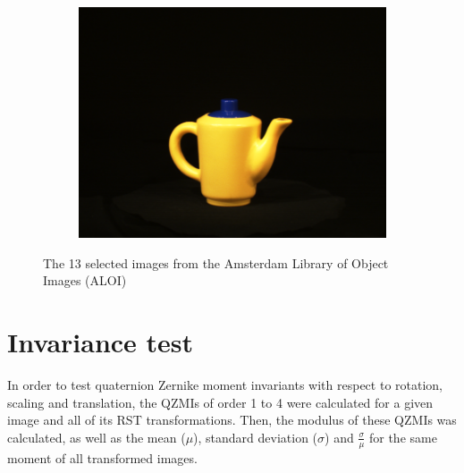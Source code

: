 \begin{figure}[tbp]
\begin{subfigure}{80pt}
    \includegraphics[width=\textwidth]{figures/aloi_original/875.png}
    \caption{}
	\end{subfigure}
	\caption{The 13 selected images from the Amsterdam Library of Object Images (ALOI)}
	\label{fig:aloi_original}

\end{figure}

\section{Invariance test}
In order to test quaternion Zernike moment invariants with respect to rotation, scaling and translation, the QZMIs of order 1 to 4 were calculated for a given image and all of its RST transformations. Then, the modulus of these QZMIs was calculated, as well as the mean ($\mu$), standard deviation ($\sigma$) and $\frac{\sigma}{\mu}$ for the same moment of all transformed images.

